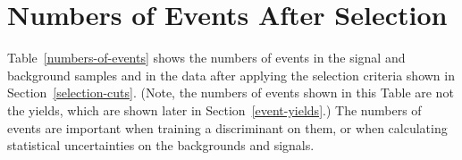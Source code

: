 %
\section{Numbers of Events After Selection}
\label{event-numbers}

Table~\ref{numbers-of-events} shows the numbers of events in the
signal and background samples and in the data after applying the
selection criteria shown in Section~\ref{selection-cuts}. (Note, the
numbers of events shown in this Table are not the yields, which are
shown later in Section~\ref{event-yields}.) The numbers of events are
important when training a discriminant on them, or when calculating
statistical uncertainties on the backgrounds and signals.

